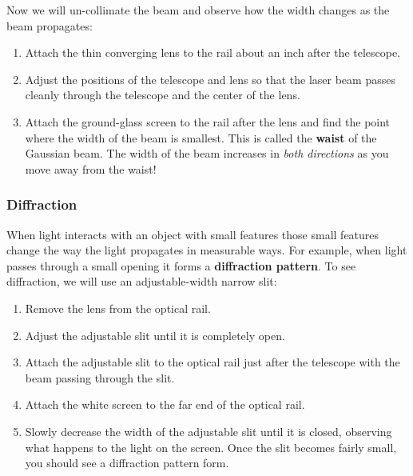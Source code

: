 \documentclass[]{manual}
\begin{document}
    Now we will un-collimate the beam and observe how the width changes as the beam propagates:
    \begin{enumerate}
        \item Attach the thin converging lens to the rail about an inch after the telescope.
        \item Adjust the positions of the telescope and lens so that the laser beam passes cleanly through the telescope and the center of the lens.
        \item Attach the ground-glass screen to the rail after the lens and find the point where the width of the beam is smallest.
        This is called the \textbf{waist} of the Gaussian beam.
        The width of the beam increases in \textit{both directions} as you move away from the waist!
    \end{enumerate}


    \subsubsection{Diffraction}

    When light interacts with an object with small features those small features change the way the light propagates in measurable ways.
    For example, when light passes through a small opening it forms a \textbf{diffraction pattern}.
    To see diffraction, we will use an adjustable-width narrow slit:
    \begin{enumerate}
        \item Remove the lens from the optical rail.
        \item Adjust the adjustable slit until it is completely open.
        \item Attach the adjustable slit to the optical rail just after the telescope with the beam passing through the slit.
        \item Attach the white screen to the far end of the optical rail.
        \item Slowly decrease the width of the adjustable slit until it is closed, observing what happens to the light on the screen.
        Once the slit becomes fairly small, you should see a diffraction pattern form.
    \end{enumerate}

\end{document}
